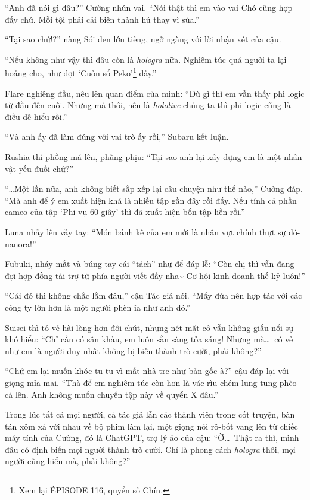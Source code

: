 \documentclass[../main.tex]{subfiles}
\begin{document}
``Anh đã nói gì đâu?'' Cường nhún vai. ``Nói thật thì em vào vai Chó cũng hợp đấy chứ. Mỗi tội phải cải biên thành hú thay vì sủa.''

``Tại sao chứ!?'' nàng Sói đen lớn tiếng, ngỡ ngàng với lời nhận xét của cậu.

``Nếu không như vậy thì đâu còn là \textit{hologra} nữa. Nghiêm túc quá người ta lại hoảng cho, như đợt `Cuốn sổ Peko'\footnote{Xem lại {\flaregothic ÉPISODE 116}, quyển số Chín.} đấy.''

Flare nghiêng đầu, nêu lên quan điểm của mình: ``Dù gì thì em vẫn thấy phi logic từ đầu đến cuối. Nhưng mà thôi, nếu là \textit{hololive} chúng ta thì phi logic cũng là điều dễ hiểu rồi.''

``Và anh ấy đã làm đúng với vai trò ấy rồi,'' Subaru kết luận.

Rushia thì phồng má lên, phũng phịu: ``Tại sao anh lại xây dựng em là một nhân vật yếu đuối chứ?''

``\dots Một lần nữa, anh không biết sắp xếp lại câu chuyện như thế nào,'' Cường đáp. ``Mà anh để ý em xuất hiện khá là nhiều tập gần đây rồi đấy. Nếu tính cả phần cameo của tập `Phi vụ 60 giây' thì đã xuất hiện bốn tập liền rồi.''

Luna nhảy lên vẫy tay: ``Món bánh kê của em mới là nhân vựt chính thựt sự đó-nanora!''

Fubuki, nháy mắt và búng tay cái ``tách'' như để đáp lễ: ``Còn chị thì vẫn đang đợi hợp đồng tài trợ từ phía người viết đấy nha\~{} Cơ hội kinh doanh thế kỷ luôn!''

``Cái đó thì không chắc lắm đâu,'' cậu Tác giả nói. ``Mấy đứa nên hợp tác với các công ty lớn hơn là một người phèn ỉa như anh đó.''

Suisei thì tỏ vẻ hài lòng hơn đôi chút, nhưng nét mặt cô vẫn không giấu nổi sự khó hiểu: ``Chỉ cần có sân khấu, em luôn sẵn sàng tỏa sáng! Nhưng mà\dots\ có vẻ như em là người duy nhất không bị biến thành trò cười, phải không?''

``Chứ em lại muốn khóc tu tu vì mất nhà tre như bản gốc à?'' cậu đáp lại với giọng mỉa mai. ``Thà để em nghiêm túc còn hơn là vác rìu chém lung tung phèo cả lên. Anh không muốn chuyển tập này về quyển X đâu.''

Trong lúc tất cả mọi người, cả tác giả lẫn các thành viên trong cốt truyện, bàn tán xôm xả với nhau về bộ phim làm lại, một giọng nói rô-bốt vang lên từ chiếc máy tính của Cường, đó là ChatGPT, trợ lý ảo của cậu: ``Ờ\dots\ Thật ra thì, mình đâu có định biến mọi người thành trò cười. Chỉ là phong cách \textit{hologra} thôi, mọi người cũng hiểu mà, phải không?''
\end{document}
